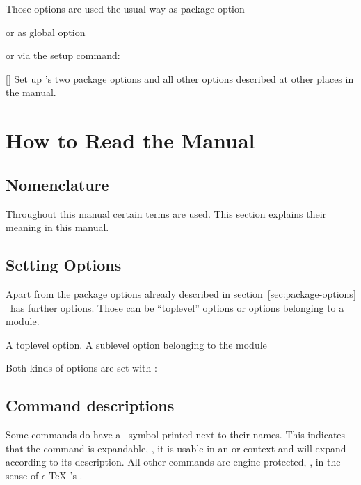 \documentclass[load-preamble+]{cnltx-doc}
\newcommand*\eTeX{%
  \texorpdfstring
    {\mbox{$\epsilon$-\TeX}}
    {e-TeX}%
}
\begin{document}
Those options are used the usual way as package option
\begin{sourcecode}
  \usepackage[verbose]{xsim}
\end{sourcecode}
or as global option
or via the setup command:
\begin{commands}
  []
    Set up \xsim's two package options and all other options described at
    other places in the manual.
\end{commands}

\section{How to Read the Manual}\label{sec:how-read-manual}

\subsection{Nomenclature}

Throughout this manual certain terms are used.  This section explains their
meaning in this manual.

\acuseall
\printacronyms[heading=none]

\subsection{Setting Options}
Apart from the package options already described in
section~\vref{sec:package-options} \xsim\ has further options. Those can be
\enquote{toplevel} options or options belonging to a module.
\begin{options}
    A toplevel option.
    A sublevel option belonging to the module 
\end{options}
Both kinds of options are set with :
\begin{sourcecode}
\end{sourcecode}

\subsection{Command descriptions}

Some commands do have a \expandablesymbol\ symbol printed next to their
names.  This indicates that the command is expandable, \ie, it is usable in an
 or  context and will expand according to its
description.  All other commands are engine protected, \ie, in the sense of
\eTeX's .
\end{document}
